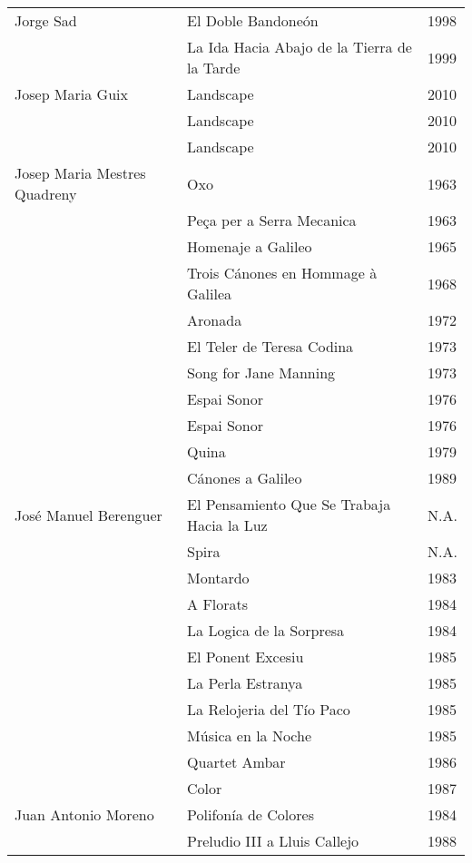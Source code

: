 \begin{center}
\begin{longtable}{ p{}  p{}  p{} }
Jorge Sad & El Doble Bandoneón & 1998 \\ \cmidrule (r){2-3} 
& La Ida Hacia Abajo de la Tierra de la Tarde & 1999 \\ \midrule 
Josep Maria Guix & Landscape & 2010 \\ \cmidrule (r){2-3} 
& Landscape & 2010 \\ \cmidrule (r){2-3} 
& Landscape & 2010 \\ \midrule 
Josep Maria Mestres Quadreny & Oxo & 1963 \\ \cmidrule (r){2-3} 
& Peça per a Serra Mecanica & 1963 \\ \cmidrule (r){2-3} 
& Homenaje a Galileo & 1965 \\ \cmidrule (r){2-3} 
& Trois Cánones en Hommage à Galilea & 1968 \\ \cmidrule (r){2-3} 
& Aronada & 1972 \\ \cmidrule (r){2-3} 
& El Teler de Teresa Codina & 1973 \\ \cmidrule (r){2-3} 
& Song for Jane Manning & 1973 \\ \cmidrule (r){2-3} 
& Espai Sonor & 1976 \\ \cmidrule (r){2-3} 
& Espai Sonor & 1976 \\ \cmidrule (r){2-3} 
& Quina & 1979 \\ \cmidrule (r){2-3} 
& Cánones a Galileo & 1989 \\ \midrule 
José Manuel Berenguer & El Pensamiento Que Se Trabaja Hacia la Luz & N.A. \\ \cmidrule (r){2-3} 
& Spira & N.A. \\ \cmidrule (r){2-3} 
& Montardo & 1983 \\ \cmidrule (r){2-3} 
& A Florats & 1984 \\ \cmidrule (r){2-3} 
& La Logica de la Sorpresa & 1984 \\ \cmidrule (r){2-3} 
& El Ponent Excesiu & 1985 \\ \cmidrule (r){2-3} 
& La Perla Estranya & 1985 \\ \cmidrule (r){2-3} 
& La Relojeria del Tío Paco & 1985 \\ \cmidrule (r){2-3} 
& Música en la Noche & 1985 \\ \cmidrule (r){2-3} 
& Quartet Ambar & 1986 \\ \cmidrule (r){2-3} 
& Color & 1987 \\ \midrule 
Juan Antonio Moreno & Polifonía de Colores & 1984 \\ \cmidrule (r){2-3} 
& Preludio III a Lluis Callejo & 1988 \\ \cmidrule (r){2-3} 

\end{longtable}
\end{center}
